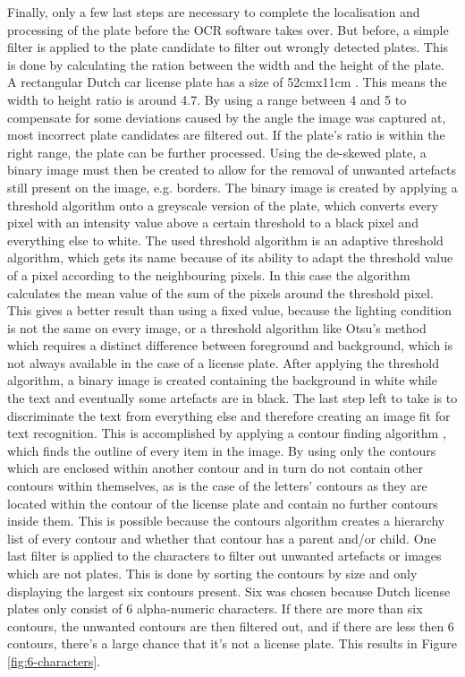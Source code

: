 Finally, only a few last steps are necessary to complete the localisation and processing of the plate before the OCR software takes over. But before, a simple filter is applied to the plate candidate to filter out wrongly detected plates. This is done by calculating the ration between the width and the height of the plate. A rectangular Dutch car license plate has a size of 52cmx11cm \cite{plate-size}. This means the width to height ratio is around 4.7. By using a range between 4 and 5 to compensate for some deviations caused by the angle the image was captured at, most incorrect plate candidates are filtered out. If the plate's ratio is within the right range, the plate can be further processed. Using the de-skewed plate, a binary image must then be created to allow for the removal of unwanted artefacts still present on the image, e.g. borders. The binary image is created by applying a threshold algorithm onto a greyscale version of the plate, which converts every pixel with an intensity value above a certain threshold to a black pixel and everything else to white. The used threshold algorithm is an adaptive threshold algorithm, which gets its name because of its ability to adapt the threshold value of a pixel according to the neighbouring pixels. In this case the algorithm calculates the mean value of the sum of the pixels around the threshold pixel. This gives a better result than using a fixed value, because the lighting condition is not the same on every image, or a threshold algorithm like Otsu's method \cite{otsu} which requires a distinct difference between foreground and background, which is not always available in the case of a license plate. After applying the threshold algorithm, a binary image is created containing the background in white while the text and eventually some artefacts are in black. The last step left to take is to discriminate the text from everything else and therefore creating an image fit for text recognition. This is accomplished by applying a contour finding algorithm \cite{suzuki}, which finds the outline of every item in the image. By using only the contours which are enclosed within another contour and in turn do not contain other contours within themselves, as is the case of the letters' contours as they are located within the contour of the license plate and contain no further contours inside them. This is possible because the contours algorithm creates a hierarchy list of every contour and whether that contour has a parent and/or child. One last filter is applied to the characters to filter out unwanted artefacts or images which are not plates. This is done by sorting the contours by size and only displaying the largest six contours present. Six was chosen because Dutch license plates only consist of 6 alpha-numeric characters. If there are more than six contours, the unwanted contours are then filtered out, and if there are less then 6 contours, there's a large chance that it's not a license plate. This results in Figure \ref{fig:6-characters}. 


